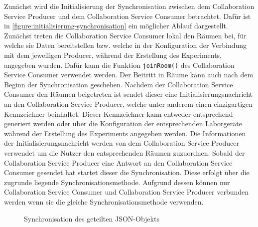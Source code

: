 Zunächst wird die Initialisierung der Synchronisation zwischen dem Collaboration Service Producer und dem Collaboration Service Consumer betrachtet. Dafür ist in \autoref{figure:initialisierung-synchronisation} ein möglicher Ablauf dargestellt. Zunächst treten die Collaboration Service Consumer lokal den Räumen bei, für welche sie Daten bereitstellen bzw. welche in der Konfiguration der Verbindung mit dem jeweiligen Producer, während der Erstellung des Experiments, angegeben wurden. Dafür kann die Funktion \texttt{joinRoom()} des Collaboration Service Consumer verwendet werden. Der Beitritt in Räume kann auch nach dem Beginn der Synchronisation geschehen. Nachdem der Collaboration Service Consumer den Räumen beigetreten ist sendet dieser eine Initialisierungsnachricht an den Collaboration Service Producer, welche unter anderem einen einzigartigen Kennzeichner beinhaltet. Dieser Kennzeichner kann entweder entsprechend generiert werden oder über die Konfiguration der entsprechenden Laborgeräte während der Erstellung des Experiments angegeben werden. Die Informationen der Initialisierungsnachricht werden von dem Collaboration Service Producer verwendet um die Nutzer den entsprechenden Räumen zuzuordnen. Sobald der Collaboration Service Producer eine Antwort an den Collaboration Service Consumer gesendet hat startet dieser die Synchronisation. Diese erfolgt über die zugrunde liegende Synchronisationsmethode. Aufgrund dessen können nur Collaboration Service Consumer und Collaboration Service Producer verbunden werden wenn sie die gleiche Synchronisationsmethode verwenden.

\begin{figure}[tbp]
    \centering

    \caption{Synchronisation des geteilten JSON-Objekts}
    \label{figure:synchronisation-des-geteilten-json-objekts}
\end{figure}

